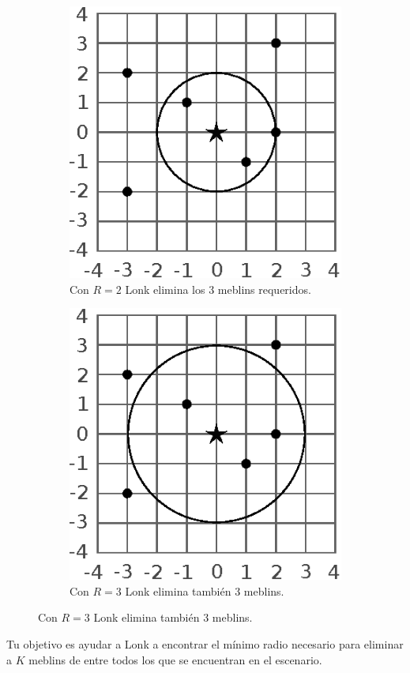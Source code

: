 \documentclass{oci}
\begin{document}
\begin{problemDescription}
  \begin{figure}[h]
    \centering
    \begin{subfigure}{0.3\textwidth}
      \centering
      \includegraphics[scale=0.8]{zolda2}
      \caption*{Con $R=2$ Lonk elimina los 3 meblins requeridos.}
    \end{subfigure}
    \hspace{3em}
    \begin{subfigure}{0.3\textwidth}
      \centering
      \includegraphics[scale=0.8]{zolda3}
      \caption*{Con $R=3$ Lonk elimina también 3 meblins.}
    \end{subfigure}
  \end{figure}

  Tu objetivo es ayudar a Lonk a encontrar el mínimo radio necesario para eliminar a $K$ meblins de entre todos los que se
  encuentran en el escenario.
\end{problemDescription}
\end{document}
